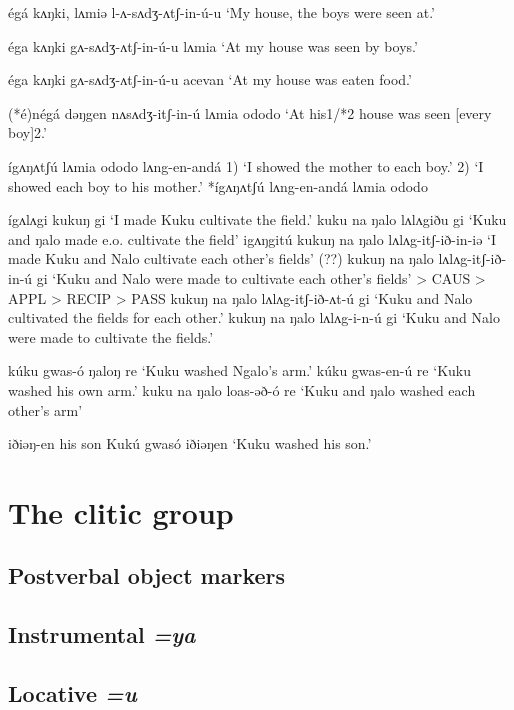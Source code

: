  
égá kʌŋki, lʌmiə l-ʌ-sʌdʒ-ʌtʃ-in-ú-u  ‘My house, the boys were seen at.’

éga kʌŋki gʌ-sʌdʒ-ʌtʃ-in-ú-u lʌmia	‘At my house was seen by boys.’

éga kʌŋki gʌ-sʌdʒ-ʌtʃ-in-ú-u acevan	‘At my house was eaten food.’
 
(*é)négá dəŋgen nʌsʌdʒ-itʃ-in-ú lʌmia ododo		‘At his1/*2 house was seen [every boy]2.’
 
ígʌŋʌtʃú lʌmia ododo lʌng-en-andá			1)  ‘I showed the mother to each boy.’
							2) ‘I showed each boy to his mother.’
*ígʌŋʌtʃú lʌng-en-andá lʌmia ododo


ígʌlʌgi kukuŋ gi		‘I made Kuku cultivate the field.’ 
kuku na ŋalo lʌlʌgiðu gi	‘Kuku and ŋalo made e.o. cultivate the field’
igʌŋgitú kukuŋ na ŋalo lʌlʌg-itʃ-ið-in-iə	‘I made Kuku and Nalo cultivate each other’s fields’ (??)
kukuŋ na ŋalo lʌlʌg-itʃ-ið-in-ú gi	‘Kuku and Nalo were made to cultivate each other’s fields’ 
> CAUS > APPL > RECIP > PASS
kukuŋ na ŋalo lʌlʌg-itʃ-ið-ʌt-ú gi	‘Kuku and Nalo cultivated the fields for each other.’
kukuŋ na ŋalo lʌlʌg-i-n-ú gi		‘Kuku and Nalo were made to cultivate the fields.’
 
kúku gwas-ó ŋaloŋ re			‘Kuku washed Ngalo’s arm.’
kúku gwas-en-ú re				‘Kuku washed his own arm.’
kuku na ŋalo loas-əð-ó re		‘Kuku and ŋalo washed each other’s arm’
 
iðiəŋ-en			his son
Kukú gwasó iðiəŋen				‘Kuku washed his son.’
 


\section{The clitic group}\label{sec:ch11:clitic}

\subsection{Postverbal object markers}

\subsection{Instrumental \textit{=ya}}

\subsection{Locative \textit{=u}}


%
